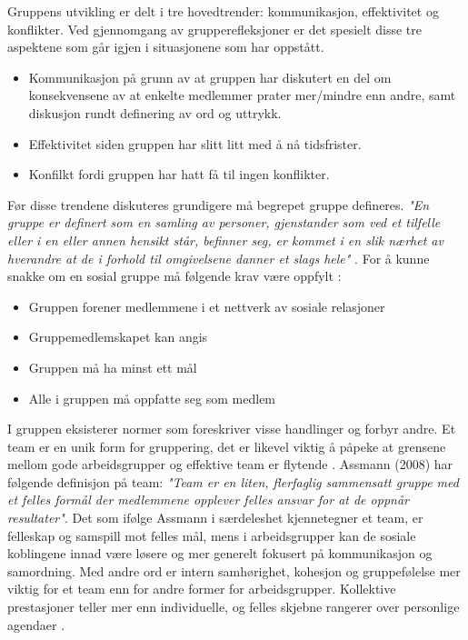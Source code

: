 Gruppens utvikling er delt i tre hovedtrender: kommunikasjon, effektivitet og konflikter.
Ved gjennomgang av grupperefleksjoner er det spesielt disse tre aspektene som går igjen i situasjonene som har oppstått.
\begin{itemize}
\item Kommunikasjon på grunn av at gruppen har diskutert en del om konsekvensene av at enkelte medlemmer prater mer/mindre enn andre, samt diskusjon rundt definering av ord og uttrykk.
\item Effektivitet siden gruppen har slitt litt med å nå tidsfrister.
\item Konfilkt fordi gruppen har hatt få til ingen konflikter.
\end{itemize}

Før disse trendene diskuteres grundigere må begrepet gruppe defineres. 
\emph{"En gruppe er definert som en samling av personer, gjenstander som ved et tilfelle eller i en eller annen hensikt står, befinner seg, er kommet i en slik nærhet av hverandre at de i forhold til omgivelsene danner et slags hele"} \cite{prosjekteringsledelse}.
For å kunne snakke om en sosial gruppe må følgende krav være oppfylt \cite{orgorg}:
\begin{itemize}
\item Gruppen forener medlemmene i et nettverk av sosiale relasjoner
\item Gruppemedlemskapet kan angis
\item Gruppen må ha minst ett mål
\item Alle i gruppen må oppfatte seg som medlem
\end{itemize}
I gruppen eksisterer normer som foreskriver visse handlinger og forbyr andre.
Et team er en unik form for gruppering, det er likevel viktig å påpeke at grensene mellom gode arbeidsgrupper og effektive team er flytende \cite{orgorg}.
Assmann (2008) har følgende definisjon på team: \emph{"Team er en liten, flerfaglig sammensatt gruppe med et felles formål der medlemmene opplever felles ansvar for at de oppnår resultater"}.
Det som ifølge Assmann i særdeleshet kjennetegner et team, er felleskap og samspill mot felles mål, mens i arbeidsgrupper kan de sosiale koblingene innad være løsere og mer generelt fokusert på kommunikasjon og samordning.
Med andre ord er intern samhørighet, kohesjon og gruppefølelse mer viktig for et team enn for andre former for arbeidsgrupper.
Kollektive prestasjoner teller mer enn individuelle, og felles skjebne rangerer over personlige agendaer \cite{orgorg}.